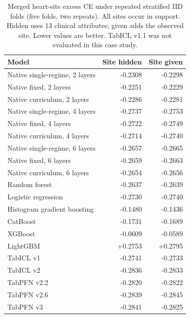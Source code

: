 \begin{table}[htbp]\centering\small
\caption{Merged heart-site excess CE under repeated stratified IID folds (five folds, two repeats). All sites occur in support. Hidden uses 13 clinical attributes; given adds the observed site. Lower values are better. TabICL v1.1 was not evaluated in this case study.}\label{tab:heart_iid}
\begin{tabular}{@{}lrr@{}}\toprule
Model & Site hidden & Site given\\\midrule
Native single-regime, 2 layers & -0.2308 & -0.2298\\
Native fixed, 2 layers & -0.2251 & -0.2229\\
Native curriculum, 2 layers & -0.2286 & -0.2281\\
Native single-regime, 4 layers & -0.2737 & -0.2753\\
Native fixed, 4 layers & -0.2722 & -0.2749\\
Native curriculum, 4 layers & -0.2714 & -0.2740\\
Native single-regime, 6 layers & -0.2657 & -0.2665\\
Native fixed, 6 layers & -0.2659 & -0.2663\\
Native curriculum, 6 layers & -0.2654 & -0.2656\\
Random forest & -0.2637 & -0.2639\\
Logistic regression & -0.2730 & -0.2740\\
Histogram gradient boosting & -0.1480 & -0.1436\\
CatBoost & -0.1731 & -0.1689\\
XGBoost & -0.0609 & -0.0589\\
LightGBM & +0.2753 & +0.2795\\
TabICL v1 & -0.2741 & -0.2733\\
TabICL v2 & -0.2836 & -0.2833\\
TabPFN v2.2 & -0.2820 & -0.2822\\
TabPFN v2.6 & -0.2839 & -0.2845\\
TabPFN v3 & -0.2841 & -0.2825\\
\bottomrule\end{tabular}\end{table}
